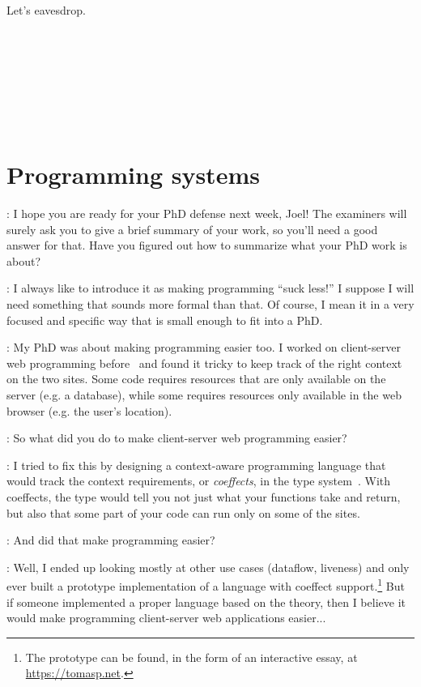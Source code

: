 \documentclass[runningheads]{llncs}
\newcommand{\T}{Tomas}
\newcommand{\J}{Joel}
\newcommand{\says}[2][gg]{\vspace{0.5em}\noindent\hangindent=0.5cm{\textsc{#1}}: #2}
\begin{document}
Let's eavesdrop.

~

~

~

~

\section{Programming systems}

\says[\T]{I hope you are ready for your PhD defense next week, Joel! The examiners will surely ask you to give a brief summary of your work, so you'll need a good answer for that. Have you figured out how to summarize what your PhD work is about?}

\says[\J]{I always like to introduce it as making programming ``suck less!'' I suppose I will need something that sounds more formal than that. Of course, I mean it in a very focused and specific way that is small enough to fit into a PhD.}

\says[\T]{My PhD was about making programming easier too. I worked on client-server web programming before~\cite{petricek-2007-fswebtools} and found it tricky to keep track of the right context on the two sites. Some code requires resources that are only available on the server (e.g. a database), while some requires resources only available in the web browser (e.g. the user's location).}

\says[\J]{So what did you do to make client-server web programming easier?}

\says[\T]{I tried to fix this by designing a context-aware programming language that would track the context requirements, or \emph{coeffects}, in the type system~\cite{petricek-2013-coeffects}. With coeffects, the type would tell you not just what your functions take and return, but also that some part of your code can run only on some of the sites.}

\says[\J]{And did that make programming easier?}

\says[\T]{Well, I ended up looking mostly at other use cases (dataflow, liveness) and only ever built a prototype implementation of a  language with coeffect support.\footnote{The prototype can be found, in the form of an interactive essay, at \url{https://tomasp.net}.} But if someone implemented a proper language based on the theory, then I believe it would make programming client-server web applications easier...}
\end{document}
